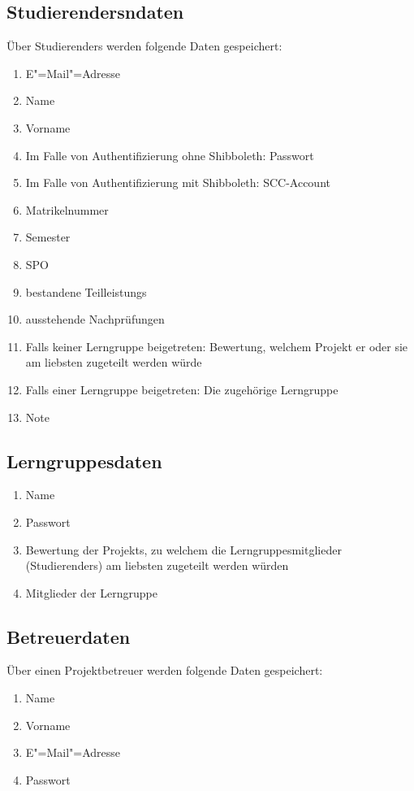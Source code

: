 \documentclass[parskip=full]{scrartcl}
\newcommand{\swtLabel}[1]{\textbf{/#1\arabic*0/}}
\begin{document}
\subsection{\glspl{Studierender}ndaten} 
Über \glspl{Studierender} werden folgende Daten gespeichert:
\begin{enumerate}[label=\swtLabel{D}, resume] 
  \item E"=Mail"=Adresse \label{SDatenAnfang}
  \item Name
  \item Vorname
  \item Im Falle von Authentifizierung ohne \gls{Shibboleth}: Passwort
  \item Im Falle von Authentifizierung mit \gls{Shibboleth}: \gls{SCC-Account}
  \item \gls{Matrikelnummer}
  \item Semester
  \item \gls{SPO}
  \item bestandene \glspl{Teilleistung} 
  \item ausstehende Nachprüfungen \label{SDatenEnde}
  
  \item Falls keiner \gls{Lerngruppe} beigetreten: \gls{Bewertung}, welchem \gls{Projekt} er oder
  sie am liebsten zugeteilt werden würde
  \item Falls einer \gls{Lerngruppe} beigetreten: Die zugehörige
  \gls{Lerngruppe}
  \item Note
\end{enumerate}
\subsection{\glspl{Lerngruppe}daten} 
\begin{enumerate}[label=\swtLabel{D}, resume] 
  \item Name
  \item Passwort
  \item \gls{Bewertung} der \glspl{Projekt}, zu welchem die \glspl{Lerngruppe}mitglieder
  (\glspl{Studierender}) am liebsten zugeteilt werden würden
  \item Mitglieder der \gls{Lerngruppe}
\end{enumerate}


\subsection{Betreuerdaten}
Über einen \gls{Projektbetreuer} werden folgende Daten gespeichert:
\begin{enumerate}[label=\swtLabel{D}, resume] 
	\item Name \label{DbetAnfang}
	\item Vorname
	\item E"=Mail"=Adresse
	\item Passwort \label{DbetEnde}
\end{enumerate}
\end{document}
